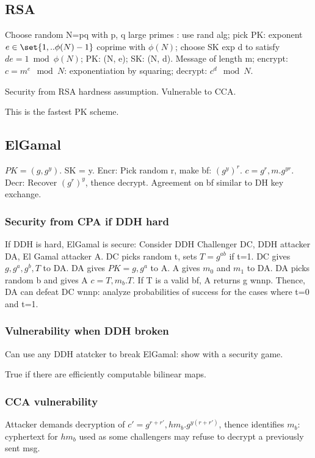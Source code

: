\documentclass[oneside, article]{memoir}
\begin{document}
\subsection{RSA}
Choose random N=pq with p, q large primes : use rand alg; pick PK: exponent $e \in \set{1, .. \phi(N)-1}$ coprime with $\phi(N)$; choose SK exp d to satisfy $de = 1 \bmod \phi(N)$; PK: (N, e); SK: (N, d). Message of length m; encrypt: $c = m^{e} \mod N$: exponentiation by squaring; decrypt: $c^{d} \mod N$.

Security from RSA hardness assumption. Vulnerable to CCA.

This is the fastest PK scheme.

\subsection{ElGamal}
$PK = (g, g^{y})$. SK = y. Encr: Pick random r, make bf: $(g^{y})^{r}$. $c = g^{r}, m.g^{yr}$. Decr: Recover $(g^{r})^{y}$, thence decrypt. Agreement on bf similar to DH key exchange.

\subsubsection{Security from CPA if DDH hard}
If DDH is hard, ElGamal is secure: Consider DDH Challenger DC, DDH attacker DA, El Gamal attacker A. DC picks random t, sets $T = g^{ab}$ if t=1. DC gives $g, g^{a}, g^{b}, T$ to DA. DA gives $PK = g, g^{a}$ to A. A gives $m_0$ and $m_1$ to DA. DA picks random b and gives A $c = T, m_b. T$. If T is a valid bf, A returns g wnnp. Thence, DA can defeat DC wnnp: analyze probabilities of success for the cases where t=0 and t=1.

\subsubsection{Vulnerability when DDH broken}
Can use any DDH atatcker to break ElGamal: show with a security game.

True if there are efficiently computable bilinear maps.

\subsubsection{CCA vulnerability}
Attacker demands decryption of $c' = g^{r + r'}, hm_{b}.g^{y(r + r')}$, thence identifies $m_{b}$: cyphertext for $hm_{b}$ used as some challengers may refuse to decrypt a previously sent msg.
\end{document}
